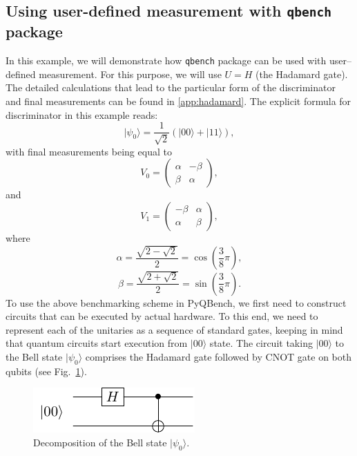 \documentclass[preprint,12pt, a4paper, dvipsnames]{elsarticle}
\newcommand{\ket}[1]{\ensuremath{|#1\rangle}}
\newcommand{\1}{{\rm 1\hspace{-0.9mm}l}}
\theoremstyle{definition}
\begin{document}
\subsection{Using user-defined measurement with \texttt{qbench} package}
In this example, we will demonstrate how \texttt{qbench} package can be used with user--defined
measurement. For this purpose, we will use $U = H$ (the Hadamard gate). The detailed calculations
that lead to the particular form of the discriminator and final measurements can be found in
\ref{app:hadamard}.
\noindent
The explicit formula for discriminator in this example reads:
\begin{equation}
\ket{\psi_0} = \frac{1}{\sqrt{2}} (\ket{00} + \ket{11}),
\end{equation}
with final measurements being equal to
\begin{equation}
V_0 =
\left(\begin{array}{cc} \alpha & -\beta\\ \beta & \alpha \end{array}\right),
\end{equation}
and \begin{equation}
V_1 =
\left(\begin{array}{cc} -\beta & \alpha \\ \alpha & \beta \end{array}\right),
\end{equation}
where \begin{equation}
\alpha = \frac{\sqrt{2 - \sqrt{2}}}{2} = \cos\left( \frac{3}{8} \pi \right),
\end{equation}
\begin{equation}
\beta  = \frac{\sqrt{2  + \sqrt{2}}}{2} = \sin\left( \frac{3}{8} \pi \right).
\end{equation}
To use the above benchmarking scheme in PyQBench, we first need to construct circuits that can be executed by actual hardware. To this end, we need to represent each of the unitaries as a sequence of standard gates, keeping in mind that quantum circuits start execution from  $\ket{00}$ state. The circuit taking $\ket{00}$ to the Bell state $\ket{\psi_0}$  comprises the Hadamard gate followed by CNOT gate on both qubits (see Fig.~\ref{fig:discriminator}).
\begin{figure}[h!]
	\centering
	\includegraphics[scale=1.7]{pics/discriminator}
	\caption{Decomposition of the Bell state $\ket{\psi_0}$. }
	\label{fig:discriminator}
\end{figure}
\end{document}
